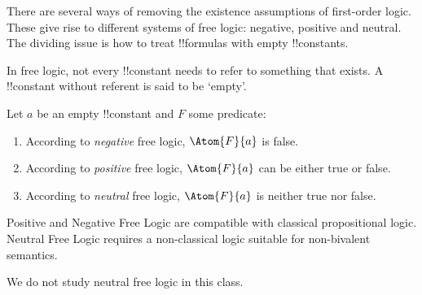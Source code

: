 \documentclass[../../../include/open-logic-section]{subfiles}
\begin{document}


There are several ways of removing the existence assumptions of
first-order logic. These give rise to different systems of free logic:
negative, positive and neutral. The dividing issue is how to treat 
!!{formula}s with empty !!{constant}s.

\begin{explain}
In free logic, not every !!{constant} needs to refer to something that exists.
A !!{constant} without referent is said to be `empty'. 
\end{explain}

Let $a$ be an empty !!{constant} and $F$ some predicate:

\begin{enumerate}
  \item According to \emph{negative} free logic, $\Atom{F}{a}$ is false.
  \item According to \emph{positive} free logic, $\Atom{F}{a}$ can be either
  true or false.
  \item According to \emph{neutral} free logic, $\Atom{F}{a}$ is neither
  true nor false.
\end{enumerate}

Positive and Negative Free Logic are compatible with classical
propositional logic. Neutral Free Logic requires a non-classical
logic suitable for non-bivalent semantics.

{We do not study neutral free logic in this class.}
\end{document}
